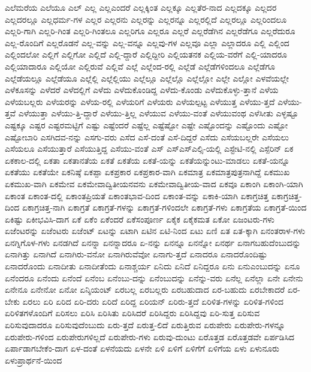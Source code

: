 {ಎಲೆಮರೆಯ
ಎಲೆಯೂ
ಎಲ್
ಎಲ್ಲ
ಎಲ್ಲಎಂದರೆ
ಎಲ್ಲಕ್ಕಿಂತ
ಎಲ್ಲಕ್ಕೂ
ಎಲ್ಲತೆರ-ನಾದ
ಎಲ್ಲದಕ್ಕೂ
ಎಲ್ಲದರ
ಎಲ್ಲದರಲ್ಲೂ
ಎಲ್ಲಧರ್ಮ-ಗಳ
ಎಲ್ಲರ
ಎಲ್ಲರನು
ಎಲ್ಲರನ್ನು
ಎಲ್ಲರನ್ನೂ
ಎಲ್ಲರಲ್ಲಿದೆ
ಎಲ್ಲರಲ್ಲೂ
ಎಲ್ಲರಿಂದಲೂ
ಎಲ್ಲರಿ-ಗಾಗಿ
ಎಲ್ಲರಿ-ಗಿಂತ
ಎಲ್ಲರಿ-ಗಿಂತಲೂ
ಎಲ್ಲರಿಗೂ
ಎಲ್ಲರೂ
ಎಲ್ಲರೆ
ಎಲ್ಲರೆಡೆಗಿನ
ಎಲ್ಲರೆಡೆಗೂ
ಎಲ್ಲರೆದುರೂ
ಎಲ್ಲ-ರೊಂದಿಗೆ
ಎಲ್ಲರೊಡನೆ
ಎಲ್ಲ-ವನ್ನು
ಎಲ್ಲ-ವನ್ನೂ
ಎಲ್ಲವು-ಗಳ
ಎಲ್ಲವೂ
ಎಲ್ಲಾ
ಎಲ್ಲಾದರೂ
ಎಲ್ಲಿ
ಎಲ್ಲಿಂದ
ಎಲ್ಲಿಂದಲೋ
ಎಲ್ಲಿಗೆ
ಎಲ್ಲಿಗೋ
ಎಲ್ಲಿದೆ
ಎಲ್ಲಿ-ದ್ದಾರೆ
ಎಲ್ಲಿದ್ದೀರಿ
ಎಲ್ಲಿಯತನಕ
ಎಲ್ಲಿಯ-ವರೆಗೆ
ಎಲ್ಲಿ-ಯಾದರೂ
ಎಲ್ಲಿಯಾದಾರೂ
ಎಲ್ಲಿಯೋ
ಎಲ್ಲಿರುವೆ
ಎಲ್ಲಿವೆ
ಎಲ್ಲೆ
ಎಲ್ಲೆಂದ-ರಲ್ಲಿ
ಎಲ್ಲೆಡೆ
ಎಲ್ಲೆಡೆಗಳಿಂದಲೂ
ಎಲ್ಲೆಡೆಗೂ
ಎಲ್ಲೆಡೆಯಲ್ಲೂ
ಎಲ್ಲೆಡೆಯೂ
ಎಲ್ಲೆಲ್ಲಿ
ಎಲ್ಲೆಲ್ಲಿಯು
ಎಲ್ಲೆಲ್ಲೂ
ಎಲ್ಲೆಲ್ಲೊ
ಎಲ್ಲೆಲ್ಲೋ
ಎಲ್ಲೇ
ಎಲ್ಲೋ
ಎಳವೆಯಲ್ಲೇ
ಎಳೆಕೂಸನ್ನು
ಎಳೆದರೆ
ಎಳೆದಲ್ಲಿಗೆ
ಎಳೆದು
ಎಳೆದುಕೊಂಡಿದ್ದ
ಎಳೆದು-ಕೊಂಡು
ಎಳೆದುಕೊಳ್ಳು-ತ್ತಾನೆ
ಎಳೆಯ
ಎಳೆಯಬಲ್ಲರು
ಎಳೆಯರನ್ನು
ಎಳೆಯ-ರಲ್ಲಿ
ಎಳೆಯರಿಗೆ
ಎಳೆಯರು
ಎಳೆಯಲ್ಪಟ್ಟ
ಎಳೆಯುತ್ತ
ಎಳೆಯು-ತ್ತದೆ
ಎಳೆಯು-ತ್ತವೆ
ಎಳೆಯುತ್ತಾ
ಎಳೆಯು-ತ್ತಿ-ದ್ದಾರೆ
ಎಳೆಯು-ತ್ತಿಲ್ಲ
ಎಳೆಯುವ
ಎಳೆಯು-ವಂತೆ
ಎಳೆಯುವಂಥ
ಎಳೆಸೀತು
ಎಳ್ಳಷ್ಟೂ
ಎಷ್ಟಕ್ಕೂ
ಎಷ್ಟರ
ಎಷ್ಟರಮಟ್ಟಿಗೆ
ಎಷ್ಟು
ಎಷ್ಟೆಂದರೆ
ಎಷ್ಟೆಲ್ಲ
ಎಷ್ಟೆಷ್ಟೋ
ಎಷ್ಟೇ
ಎಷ್ಟೊಂದನ್ನು
ಎಷ್ಟೊಂದು
ಎಷ್ಟೋ
ಎಷ್ಟೋಬಾರಿ
ಎಸಗಿದವ-ನನ್ನು
ಎಸಗು-ವರು
ಎಸೆದ
ಎಸೆ-ದಂತೆ
ಎಸೆ-ದಿದ್ದರೆ
ಎಸೆದು
ಎಸೆಯಬಲ್ಲರೇ
ಎಸೆಯಲು
ಎಸೆಯಲೂ
ಎಸೆಯುತ್ತಾರೆ
ಎಸೆಯುತ್ತಿದ್ದ
ಎಸೆಯು-ವಂತೆ
ಎಸ್
ಎಸ್ಎಸ್ಎಲ್ಸಿ-ಯಲ್ಲಿ
ಎಸ್ಟೇಟಿ-ನಲ್ಲಿ
ಎಸ್ಪೆರಿನ್
ಏಕ
ಏಕಕಾಲ-ದಲ್ಲಿ
ಏಕತಾ
ಏಕತಾನತೆಯ
ಏಕತೆ
ಏಕತೆಯ
ಏಕತೆ-ಯನ್ನು
ಏಕತೆಯನ್ನುಂಟು-ಮಾಡಲು
ಏಕತೆ-ಯನ್ನೂ
ಏಕತೆಯು
ಏಕತೆಯೇ
ಏಕನಿಷ್ಠೆ
ಏಕಪ್ಪಾ
ಏಕಪ್ರಕಾರ
ಏಕಪ್ರಕಾರ-ವಾಗಿ
ಏಕಮಾತ್ರ
ಏಕಮಾತ್ರಪುತ್ರನಾಗಿದ್ದೆ
ಏಕಮುಖ
ಏಕಮುಖ-ವಾಗಿ
ಏಕಮೇವ
ಏಕಮೇವಾದ್ವಿತೀಯನವನು
ಏಕಮೇವಾದ್ವಿತೀಯ-ವಾದ
ಏಕವೂ
ಏಕಾಂಗಿ
ಏಕಾಂಗಿ-ಯಾಗಿ
ಏಕಾಂತ
ಏಕಾಂತ-ದಲ್ಲಿ
ಏಕಾಂತಪ್ರಿಯತೆ
ಏಕಾಂತಭಾವ-ದಿಂದ
ಏಕಾಂತ-ವನ್ನು
ಏಕಾಕಿ-ಯಾಗಿ
ಏಕಾಗ್ರಚಿತ್ತ
ಏಕಾಗ್ರಚಿತ್ತ-ದಿಂದ
ಏಕಾಗ್ರಚಿತ್ತ-ನಾಗಿ
ಏಕಾಗ್ರತೆ
ಏಕಾಗ್ರತೆ-ಗಳನ್ನು
ಏಕಾಗ್ರತೆ-ಗಳಿಂದಲೇ
ಏಕಾಗ್ರತೆ-ಗಳು
ಏಕಾಗ್ರತೆಯ
ಏಕಾಗ್ರತೆ-ಯಿಂದ
ಏಕಿಷ್ಟು
ಏಕೀಭವಿಸಿ-ದಾಗ
ಏಕೆ
ಏಕೆಂ
ಏಕೆಂದರೆ
ಏಕೆಸಂಪೂರ್ಣ
ಏಕೈಕ
ಏಕೈಕಮತ
ಏಕೋ
ಏಜಂಟರು-ಗಳು
ಏಜೆಂಟರನ್ನು
ಏಜೆಂಟರು
ಏಜೆಂಟ್
ಏಟನ್ನು
ಏಟಾಗಿ
ಏಟಿನ
ಏಟಿ-ನಿಂದ
ಏಟು
ಏಣಿ
ಏತ
ಏತ-ಕ್ಕಾಗಿ
ಏನಂತರಾಳ-ಗಳು
ಏನಗ್ನಿಗೊಳ-ಗಳು
ಏನಡಗಿದೆ
ಏನನ್ನಾ
ಏನನ್ನಾದರೂ
ಏ-ನನ್ನು
ಏನನ್ನೂ
ಏನನ್ನೋ
ಏನರ್ಥ
ಏನಾಗಬಹುದೆಂಬುದನ್ನು
ಏನಾಗಿತ್ತು
ಏನಾಗಿದೆ
ಏನಾಗಿರು-ವನೋ
ಏನಾಗಿರುವೆವೋ
ಏನಾಗು-ತ್ತದೆ
ಏನಾದರೂ
ಏನಾದರೊಂದಿಷ್ಟು
ಏನಾದರೊಂದು
ಏನಾದೀತು
ಏನಾದೀತೆಂದು
ಏನಾಶ್ಚರ್ಯ
ಏನಿದು
ಏನಿದೆ
ಏನಿದ್ದರೂ
ಏನು
ಏನುಎಂಬುದನ್ನು
ಏನೂ
ಏನೆಂದರೂ
ಏನೆಂದು
ಏನೆಂದೆ
ಏನೆಂಬ
ಏನೆಂಬು-ದನ್ನು
ಏನೆಂಬುದನ್ನು
ಏನೆನ್ನು-ವರು
ಏನೆಲ್ಲ
ಏನೆಲ್ಲಾ
ಏನೇ
ಏನೇನು
ಏನೇನೂ
ಏನೇನೋ
ಏನೋ
ಏನ್ಶಿಯಂಟ್
ಏರಬಲ್ಲ
ಏರಬಲ್ಲರು
ಏರಬಹುದಾದ
ಏರ-ಬಹುದು
ಏರಬೇಕಾದರೆ
ಏರ-ಬೇಕು
ಏರಲು
ಏರಿ
ಏರಿದ
ಏರಿ-ದರು
ಏರಿದೆ
ಏರಿದ್ದ
ಏರಿಯನ್
ಏರಿರು-ತ್ತದೆ
ಏರಿಳಿತ-ಗಳನ್ನು
ಏರಿಳಿತ-ಗಳಿಂದ
ಏರಿಳಿತಗಳೊಂದಿಗೆ
ಏರಿಸಲು
ಏರಿಸಿ
ಏರಿಸಿತು
ಏರಿಸಿದರೆ
ಏರಿಸಿದ್ದರು
ಏರಿಸಿದ್ದವು
ಏರಿ-ಸುತ್ತ
ಏರಿಸುವ
ಏರಿಸುವುದಾದರೂ
ಏರಿಸುವುದೆಂಬುದು
ಏರು-ತ್ತದೆ
ಏರುತ್ತ-ಲಿದೆ
ಏರುತ್ತಿರುವ
ಏರುಪೇರು
ಏರುಪೇರು-ಗಳನ್ನೂ
ಏರುಪೇರು-ಗಳಿಂದ
ಏರುಪೇರುಗಳಿಲ್ಲದೆ
ಏರುಪೇರು-ಗಳು
ಏರುವು-ದುಂಟು
ಏರೊತ್ತಡ
ಏರೊತ್ತಡವೇ
ಏರ್ಪಡಿಸಿದ
ಏರ್ಪಾಡಾಗಬೇಕೆಂ-ದಾಗ
ಏಳ-ದಂತೆ
ಏಳನೆಯದು
ಏಳನೇ
ಏಳಿ
ಏಳಿಗೆ
ಏಳಿಗೆಗೆ
ಏಳಿಗೆಯ
ಏಳು
ಏಳುನೂರು
ಏಳುಪ್ರಾರ್ಥನೆ-ಯಿಂದ
}
